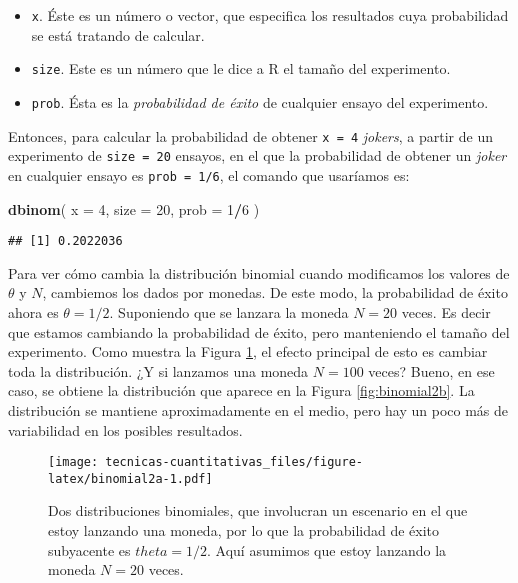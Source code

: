 \documentclass[
]{book}
\newenvironment{Shaded}{\begin{snugshade}}{\end{snugshade}}
\newcommand{\DataTypeTok}[1]{\textcolor[rgb]{0.13,0.29,0.53}{#1}}
\newcommand{\DecValTok}[1]{\textcolor[rgb]{0.00,0.00,0.81}{#1}}
\newcommand{\KeywordTok}[1]{\textcolor[rgb]{0.13,0.29,0.53}{\textbf{#1}}}
\newcommand{\NormalTok}[1]{#1}
\newcommand{\OperatorTok}[1]{\textcolor[rgb]{0.81,0.36,0.00}{\textbf{#1}}}
\providecommand{\tightlist}{%
  \setlength{\itemsep}{0pt}\setlength{\parskip}{0pt}}
\begin{document}
\begin{itemize}
\tightlist
\item
  \texttt{x}. Éste es un número o vector, que especifica los resultados cuya probabilidad se está tratando de calcular.
\item
  \texttt{size}. Este es un número que le dice a R el tamaño del experimento.
\item
  \texttt{prob}. Ésta es la \emph{probabilidad de éxito} de cualquier ensayo del experimento.
\end{itemize}

Entonces, para calcular la probabilidad de obtener \texttt{x\ =\ 4} \emph{jokers}, a partir de un experimento de \texttt{size\ =\ 20} ensayos, en el que la probabilidad de obtener un \emph{joker} en cualquier ensayo es \texttt{prob\ =\ 1/6}, el comando que usaríamos es:

\begin{Shaded}
\begin{Highlighting}[]
\KeywordTok{dbinom}\NormalTok{( }\DataTypeTok{x =} \DecValTok{4}\NormalTok{, }\DataTypeTok{size =} \DecValTok{20}\NormalTok{, }\DataTypeTok{prob =} \DecValTok{1}\OperatorTok{/}\DecValTok{6}\NormalTok{ )}
\end{Highlighting}
\end{Shaded}

\begin{verbatim}
## [1] 0.2022036
\end{verbatim}

Para ver cómo cambia la distribución binomial cuando modificamos los valores de \(\theta\) y \(N\), cambiemos los dados por monedas. De este modo, la probabilidad de éxito ahora es \(\theta=1/2\). Suponiendo que se lanzara la moneda \(N=20\) veces. Es decir que estamos cambiando la probabilidad de éxito, pero manteniendo el tamaño del experimento. Como muestra la Figura \ref{fig:binomial2a}, el efecto principal de esto es cambiar toda la distribución. ¿Y si lanzamos una moneda \(N=100\) veces? Bueno, en ese caso, se obtiene la distribución que aparece en la Figura \ref{fig:binomial2b}. La distribución se mantiene aproximadamente en el medio, pero hay un poco más de variabilidad en los posibles resultados.

\begin{figure}
\centering
\texttt{[image: tecnicas-cuantitativas\_files/figure-latex/binomial2a-1.pdf]}
\caption{\label{fig:binomial2a}Dos distribuciones binomiales, que involucran un escenario en el que estoy lanzando una moneda, por lo que la probabilidad de éxito subyacente es \(theta=1/2\). Aquí asumimos que estoy lanzando la moneda \(N=20\) veces.}
\end{figure}
\end{document}
